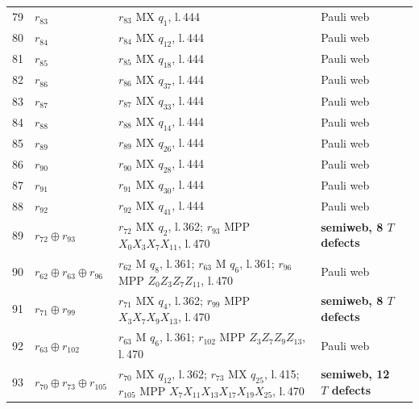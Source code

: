 \documentclass[11pt]{article}
\begin{document}
\begin{semiwebaddition}
{\begin{longtable}{rp{.3\linewidth}p{.43\linewidth}lr}
79 & $r_{83}$ & $r_{83}$ MX $q_{1}$, l.\,444 & Pauli web & \hyperref[d5_det079]{\pageref*{d5_det079}}\\
80 & $r_{84}$ & $r_{84}$ MX $q_{12}$, l.\,444 & Pauli web & \hyperref[d5_det080]{\pageref*{d5_det080}}\\
81 & $r_{85}$ & $r_{85}$ MX $q_{18}$, l.\,444 & Pauli web & \hyperref[d5_det081]{\pageref*{d5_det081}}\\
82 & $r_{86}$ & $r_{86}$ MX $q_{37}$, l.\,444 & Pauli web & \hyperref[d5_det082]{\pageref*{d5_det082}}\\
83 & $r_{87}$ & $r_{87}$ MX $q_{33}$, l.\,444 & Pauli web & \hyperref[d5_det083]{\pageref*{d5_det083}}\\
84 & $r_{88}$ & $r_{88}$ MX $q_{14}$, l.\,444 & Pauli web & \hyperref[d5_det084]{\pageref*{d5_det084}}\\
85 & $r_{89}$ & $r_{89}$ MX $q_{26}$, l.\,444 & Pauli web & \hyperref[d5_det085]{\pageref*{d5_det085}}\\
86 & $r_{90}$ & $r_{90}$ MX $q_{28}$, l.\,444 & Pauli web & \hyperref[d5_det086]{\pageref*{d5_det086}}\\
87 & $r_{91}$ & $r_{91}$ MX $q_{30}$, l.\,444 & Pauli web & \hyperref[d5_det087]{\pageref*{d5_det087}}\\
88 & $r_{92}$ & $r_{92}$ MX $q_{41}$, l.\,444 & Pauli web & \hyperref[d5_det088]{\pageref*{d5_det088}}\\
89 & $r_{72}\oplus r_{93}$ & $r_{72}$ MX $q_{2}$, l.\,362; $r_{93}$ MPP $X_{0}X_{3}X_{7}X_{11}$, l.\,470 & \textbf{semiweb, 8 $T$ defects} & \hyperref[d5_det089]{\pageref*{d5_det089}}\\
90 & $r_{62}\oplus r_{63}\oplus r_{96}$ & $r_{62}$ M $q_{8}$, l.\,361; $r_{63}$ M $q_{6}$, l.\,361; $r_{96}$ MPP $Z_{0}Z_{3}Z_{7}Z_{11}$, l.\,470 & Pauli web & \hyperref[d5_det090]{\pageref*{d5_det090}}\\
91 & $r_{71}\oplus r_{99}$ & $r_{71}$ MX $q_{4}$, l.\,362; $r_{99}$ MPP $X_{3}X_{7}X_{9}X_{13}$, l.\,470 & \textbf{semiweb, 8 $T$ defects} & \hyperref[d5_det091]{\pageref*{d5_det091}}\\
92 & $r_{63}\oplus r_{102}$ & $r_{63}$ M $q_{6}$, l.\,361; $r_{102}$ MPP $Z_{3}Z_{7}Z_{9}Z_{13}$, l.\,470 & Pauli web & \hyperref[d5_det092]{\pageref*{d5_det092}}\\
93 & $r_{70}\oplus r_{73}\oplus r_{105}$ & $r_{70}$ MX $q_{12}$, l.\,362; $r_{73}$ MX $q_{25}$, l.\,415; $r_{105}$ MPP $X_{7}X_{11}X_{13}X_{17}X_{19}X_{25}$, l.\,470 & \textbf{semiweb, 12 $T$ defects} & \hyperref[d5_det093]{\pageref*{d5_det093}}\\

\end{longtable}}
\end{semiwebaddition}
\end{document}
